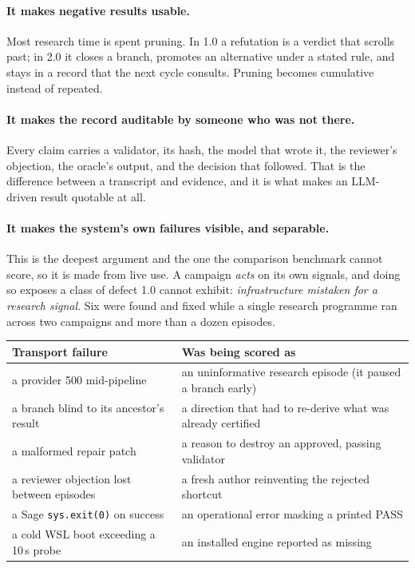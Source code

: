 \documentclass[11pt,a4paper]{article}
\newcommand{\code}[1]{\texttt{\small #1}}
\begin{document}
\paragraph{It makes negative results usable.} Most research time is spent
pruning. In 1.0 a refutation is a verdict that scrolls past; in 2.0 it closes a
branch, promotes an alternative under a stated rule, and stays in a record that
the next cycle consults. Pruning becomes cumulative instead of repeated.

\paragraph{It makes the record auditable by someone who was not there.} Every
claim carries a validator, its hash, the model that wrote it, the reviewer's
objection, the oracle's output, and the decision that followed. That is the
difference between a transcript and evidence, and it is what makes an
LLM-driven result quotable at all.

\paragraph{It makes the system's own failures visible, and separable.} This is
the deepest argument and the one the comparison benchmark cannot score, so it is
made from live use. A campaign \emph{acts} on its own signals, and doing so
exposes a class of defect 1.0 cannot exhibit: \emph{infrastructure mistaken for a
research signal}. Six were found and fixed while a single research programme ran
across two campaigns and more than a dozen episodes.

\begin{center}
\small
\begin{tabular}{@{}p{5.4cm}p{8.6cm}@{}}
\toprule
\textbf{Transport failure} & \textbf{Was being scored as} \\
\midrule
a provider 500 mid-pipeline & an uninformative research episode (it paused a branch early) \\
a branch blind to its ancestor's result & a direction that had to re-derive what was already certified \\
a malformed repair patch & a reason to destroy an approved, passing validator \\
a reviewer objection lost between episodes & a fresh author reinventing the rejected shortcut \\
a Sage \code{sys.exit(0)} on success & an operational error masking a printed PASS \\
a cold WSL boot exceeding a 10\,s probe & an installed engine reported as missing \\
\bottomrule
\end{tabular}
\end{center}
\end{document}
